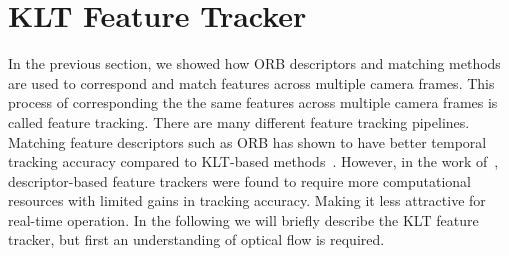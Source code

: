%



\section{KLT Feature Tracker}
\label{sec:klt}

In the previous section, we showed how ORB descriptors and matching methods are
used to correspond and match features across multiple camera frames. This
process of corresponding the the same features across multiple camera frames is
called feature tracking. There are many different feature tracking pipelines.
Matching feature descriptors such as ORB has shown to have better temporal
tracking accuracy compared to KLT-based methods~\cite{Paul2017}. However, in
the work of~\cite{Sun2018}, descriptor-based feature trackers were found to
require more computational resources with limited gains in tracking accuracy.
Making it less attractive for real-time operation. In the following we will
briefly describe the KLT feature tracker, but first an understanding of optical
flow is required.


